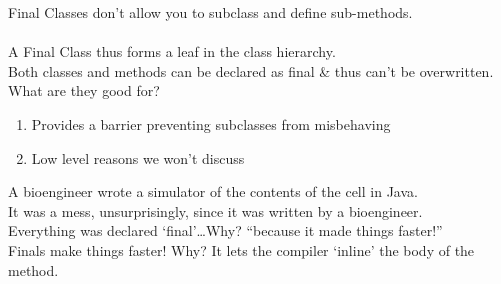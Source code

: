 \documentclass[../../lecture_notes.tex]{subfiles}
\begin{document}
\indent Final Classes don’t allow you to subclass and define sub-methods.\\
\\
A Final Class thus forms a leaf in the class hierarchy.\\
Both classes and methods can be declared as final \& thus can’t be overwritten.\\
What are they good for?
\begin{enumerate} [itemsep=0mm]
	\item Provides a barrier preventing subclasses from misbehaving
	\item Low level reasons we won’t discuss
\end{enumerate}
A bioengineer wrote a simulator of the contents of the cell in Java.\\
It was a mess, unsurprisingly, since it was written by a bioengineer.\\
Everything was declared ‘final’…Why? “because it made things faster!”\\
Finals make things faster! Why? It lets the compiler ‘inline’ the body of the method.\\
\end{document}
